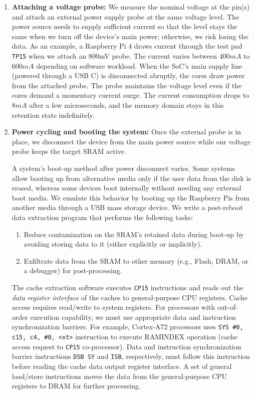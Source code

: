 \begin{enumerate}
    \item \textbf{Attaching a voltage probe:} We measure the nominal voltage at the pin(s) and attach an external power supply probe at the same voltage level. 
    The power source needs to supply sufficient current so that the level stays the same when we turn off the device's main power; otherwise, we risk losing the data. 
    As an example, a Raspberry Pi 4 draws current through the test pad \texttt{TP15} when we attach an 800mV probe. 
    The current varies between $400mA$ to $600mA$ depending on software workload. 
    When the SoC's main supply line (powered through a USB C) is disconnected abruptly, the cores draw power from the attached probe.
    The probe maintains the voltage level even if the cores demand a momentary current surge. 
    The current consumption drops to $8mA$ after a few microseconds, and the memory domain stays in this retention state indefinitely.
    
    \item \textbf{Power cycling and booting the system:} Once the external probe is in place, we disconnect the device from the main power source while our voltage probe keeps the target SRAM active. 
  
     A system's boot-up method after power disconnect varies.
     Some systems allow booting up from alternative media only if the user data from the disk is erased, whereas some devices boot internally without needing any external boot media.
     We emulate this behavior by booting up the Raspberry Pis from another media through a USB mass storage device.
     We write a post-reboot data extraction program that performs the following tasks: 
    \begin{enumerate}[label=(\Alph*)]
        \item Reduce contamination on the SRAM's retained data during boot-up by avoiding storing data to it (either explicitly or implicitly). 
        \item Exfiltrate data from the SRAM to other memory (e.g., Flash, DRAM, or a debugger) for post-processing.
   \end{enumerate}
    
     The cache extraction software executes \texttt{CP15} instructions and reads out the \textit{data register interface} of the caches to general-purpose CPU registers. Cache access requires read/write to system registers.
     For processors with out-of-order execution capability, we must use appropriate data and instruction synchronization barriers. 
     For example, Cortex-A72 processors  uses \texttt{SYS \#0, c15, c4, \#0, <xt>} instruction to execute RAMINDEX operation (cache access request to \texttt{CP15} co-processor).
     Data and instruction synchronization barrier instructions \texttt{DSB SY} and \texttt{ISB}, respectively, must follow this instruction  before reading the cache data output register interface.
     A set of general load/store instructions moves the data from the general-purpose CPU registers to DRAM for further processing.
     

\end{enumerate}

